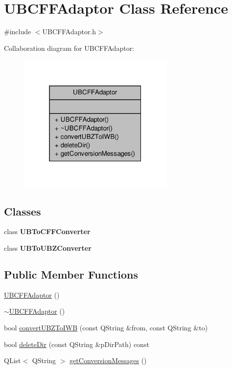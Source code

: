 \hypertarget{class_u_b_c_f_f_adaptor}{\section{U\-B\-C\-F\-F\-Adaptor Class Reference}
\label{de/d84/class_u_b_c_f_f_adaptor}
}


{\ttfamily \#include $<$U\-B\-C\-F\-F\-Adaptor.\-h$>$}



Collaboration diagram for U\-B\-C\-F\-F\-Adaptor\-:
\nopagebreak
\begin{figure}[H]
\begin{center}
\leavevmode
\includegraphics[width=220pt]{d8/d06/class_u_b_c_f_f_adaptor__coll__graph}
\end{center}
\end{figure}
\subsection*{Classes}
\begin{DoxyCompactItemize}
\item 
class {\bfseries U\-B\-To\-C\-F\-F\-Converter}
\item 
class {\bfseries U\-B\-To\-U\-B\-Z\-Converter}
\end{DoxyCompactItemize}
\subsection*{Public Member Functions}
\begin{DoxyCompactItemize}
\item 
\hyperlink{class_u_b_c_f_f_adaptor_a506410a7764fc7485311e9cca7d86c72}{U\-B\-C\-F\-F\-Adaptor} ()
\item 
\hyperlink{class_u_b_c_f_f_adaptor_ad14b15035a6ddff3f74d3f08865d45b2}{$\sim$\-U\-B\-C\-F\-F\-Adaptor} ()
\item 
bool \hyperlink{class_u_b_c_f_f_adaptor_acdbb00c051955521fd4b5625e93aff69}{convert\-U\-B\-Z\-To\-I\-W\-B} (const Q\-String \&from, const Q\-String \&to)
\item 
bool \hyperlink{class_u_b_c_f_f_adaptor_ab751ea62bef1e789811699470d0f011b}{delete\-Dir} (const Q\-String \&p\-Dir\-Path) const 
\item 
Q\-List$<$ Q\-String $>$ \hyperlink{class_u_b_c_f_f_adaptor_aef900d57600efe0161ab583f9727f55a}{get\-Conversion\-Messages} ()
\end{DoxyCompactItemize}


